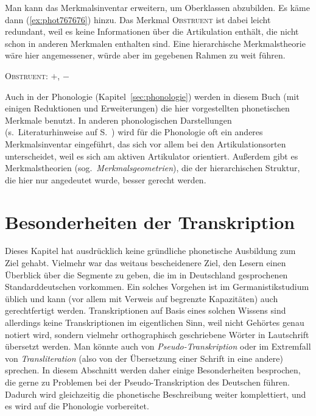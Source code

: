 Man kann das Merkmalsinventar erweitern, um Oberklassen abzubilden.
Es käme dann (\ref{ex:phot767676}) hinzu.
Das Merkmal \textsc{Obstruent} ist dabei leicht redundant, weil es keine Informationen über die Artikulation enthält, die nicht schon in anderen Merkmalen enthalten sind.
Eine hierarchische Merkmalstheorie wäre hier angemessener, würde aber im gegebenen Rahmen zu weit führen.

\begin{exe}
		\begin{xlist}
			\ex \textsc{Obstruent}: $+$, $-$
		\end{xlist}
\end{exe}

Auch in der Phonologie (Kapitel~\ref{sec:phonologie}) werden in diesem Buch (mit einigen Reduktionen und Erweiterungen) die hier vorgestellten phonetischen Merkmale benutzt.
In anderen phonologischen Darstellungen (s.\ Literaturhinweise auf S.~\pageref{abs:pholliteratur}) wird für die Phonologie oft ein anderes Merkmalsinventar eingeführt, das sich vor allem bei den Artikulationsorten unterscheidet, weil es sich am aktiven Artikulator orientiert.
Außerdem gibt es Merkmalstheorien (sog.\ \textit{Merkmalsgeometrien}), die der hierarchischen Struktur, die hier nur angedeutet wurde, besser gerecht werden.




\section{Besonderheiten der Transkription}

\label{sec:besonderheitendertranskription}

Dieses Kapitel hat ausdrücklich keine gründliche phonetische Ausbildung zum Ziel gehabt.
Vielmehr war das weitaus bescheidenere Ziel, den Lesern einen Überblick über die Segmente zu geben, die im in Deutschland gesprochenen Standarddeutschen vorkommen.
Ein solches Vorgehen ist im Germanistikstudium üblich und kann (vor allem mit Verweis auf begrenzte Kapazitäten) auch gerechtfertigt werden.
Transkriptionen auf Basis eines solchen Wissens sind allerdings keine Transkriptionen im eigentlichen Sinn, weil nicht Gehörtes genau notiert wird, sondern vielmehr orthographisch geschriebene Wörter in Lautschrift übersetzt werden.
Man könnte auch von \textit{Pseudo-Transkription} oder im Extremfall von \textit{Transliteration} (also von der Übersetzung einer Schrift in eine andere) sprechen.
In diesem Abschnitt werden daher einige Besonderheiten besprochen, die gerne zu Problemen bei der Pseudo-Transkription des Deutschen führen.
Dadurch wird gleichzeitig die phonetische Beschreibung weiter komplettiert, und es wird auf die Phonologie vorbereitet.

